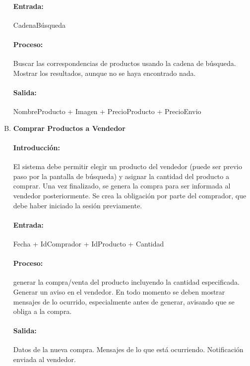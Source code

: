 \begin{enumerate}[A.]
        \paragraph{Entrada:} CadenaBúsqueda
        
        \paragraph{Proceso:} Buscar las correspondencias de productos usando la cadena de búsqueda. Mostrar los resultados, aunque no se haya encontrado nada.
        
        \paragraph{Salida:} {NombreProducto + Imagen + PrecioProducto + PrecioEnvio}
        
         \item \textbf{Comprar Productos a Vendedor}
        
        \paragraph{Introducción:} El sistema debe permitir elegir un producto del vendedor (puede ser previo paso por la pantalla de búsqueda) y asignar la cantidad del producto a comprar. Una vez finalizado, se genera la compra para ser informada al vendedor posteriormente. Se crea la obligación por parte del comprador, que debe haber iniciado la sesión previamente. 
        
        \paragraph{Entrada:} Fecha + IdComprador + IdProducto + Cantidad
        
        \paragraph{Proceso:} generar la compra/venta del producto incluyendo la cantidad especificada. Generar un aviso en el vendedor. En todo momento se deben mostrar mensajes de lo ocurrido, especialmente antes de generar, avisando que se obliga a la compra.
        
        \paragraph{Salida:} Datos de la nueva compra. Mensajes de lo que está ocurriendo. Notificación enviada al vendedor.
        

\end{enumerate}
